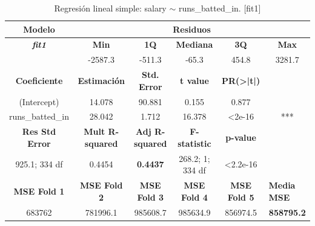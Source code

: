 \documentclass[a4paper,12pt, oneside]{book}
\begin{document}
\begin{table}[H]
\footnotesize
\centering
\begin{tabular}{cccccc}
\hline
\textbf{Modelo} & \multicolumn{5}{c}{\textbf{Residuos}} \\ \hline
\textit{\textbf{fit1}} & \textbf{Min} & \textbf{1Q} & \textbf{Mediana} & \textbf{3Q} & \textbf{Max} \\ \cline{2-6} 
\multicolumn{1}{l}{} & -2587.3 & -511.3 & -65.3 & 454.8 & 3281.7 \\ \cline{1-5}
\textbf{Coeficiente} & \textbf{Estimación} & \textbf{Std. Error} & \textbf{t value} & \textbf{PR(\textgreater{}|t|)} & \multicolumn{1}{l}{} \\ \cline{1-5}
(Intercept) & 14.078 & 90.881 & 0.155 & 0.877 &  \\
runs\_batted\_in & 28.042 & 1.712 & 16.378 & \textless{}2e-16 & *** \\ \cline{1-5}
\textbf{Res Std Error} & \textbf{Mult R-squared} & \textbf{Adj R-squared} & \textbf{F-statistic} & \textbf{p-value} & \multicolumn{1}{l}{} \\ \cline{1-5}
925.1; 334 df & 0.4454 & \textbf{0.4437} & 268.2; 1; 334 df & \textless{}2.2e-16 & \multicolumn{1}{l}{} \\ \hline
\textbf{MSE Fold 1} & \textbf{MSE Fold 2} & \textbf{MSE Fold 3} & \textbf{MSE Fold 4} & \textbf{MSE Fold 5} & \multicolumn{1}{l}{\textbf{Media MSE}} \\ \hline
683762 & 781996.1 & 985608.7 & 985634.9 & 856974.5 & \textbf{858795.2}
\end{tabular}
\caption{Regresión lineal simple: salary $\sim$ runs\_batted\_in. {[}fit1{]}}
\label{tab:fit1}
\end{table}
\end{document}

